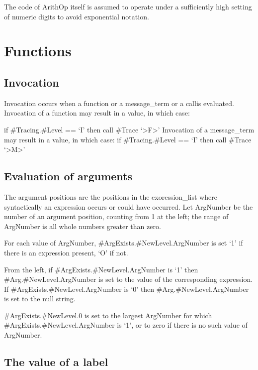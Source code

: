 The code of ArithOp itself is assumed to operate under a sufficiently
high setting of numeric digits to avoid exponential notation.


\section{Functions}\label{functions}

\subsection{Invocation}\label{invocation}

Invocation occurs when a function or a message\_term or a callis
evaluated. Invocation of a function may result in a value, in which
case:

if \#Tracing.\#Level == `I' then call \#Trace
`\textgreater F\textgreater{}' Invocation of a message\_term may result
in a value, in which case: if \#Tracing.\#Level == `I' then call \#Trace
`\textgreater M\textgreater{}'

\subsection{Evaluation of arguments}\label{evaluation-of-arguments}

The argument positions are the positions in the exoression\_list where
syntactically an expression occurs or could have occurred. Let ArgNumber
be the number of an argument position, counting from 1 at the left; the
range of ArgNumber is all whole numbers greater than zero.

For each value of ArgNumber, \#ArgExists.\#NewLevel.ArgNumber is set `1'
if there is an expression present, `O' if not.

From the left, if \#ArgExists.\#NewLevel.ArgNumber is `1' then
\#Arg.\#NewLevel.ArgNumber is set to the value of the corresponding
expression. If \#ArgExists.\#NewLevel.ArgNumber is `0' then
\#Arg.\#NewLevel.ArgNumber is set to the null string.

\#ArgExists.\#NewLevel.0 is set to the largest ArgNumber for which
\#ArgExists.\#NewLevel.ArgNumber is `1', or to zero if there is no such
value of ArgNumber.

\subsection{The value of a label}\label{the-value-of-a-label}

